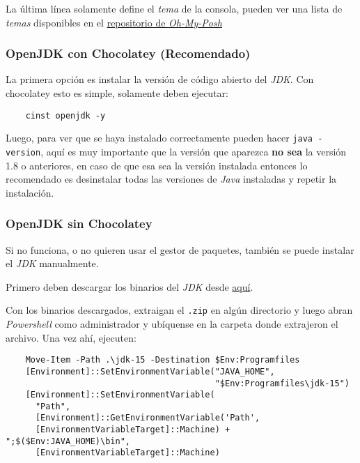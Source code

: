   La última línea solamente define el \textit{tema} de la consola, pueden ver una lista de
  \textit{temas} disponibles en el 
  \href{https://github.com/JanDeDobbeleer/oh-my-posh#themes}{repositorio de \textit{Oh-My-Posh}}

\subsubsection{OpenJDK con Chocolatey (Recomendado)}
  La primera opción es instalar la versión de código abierto del \textit{JDK}.
  Con chocolatey esto es simple, solamente deben ejecutar:
  \begin{verbatim}
    cinst openjdk -y
  \end{verbatim}
  
  Luego, para ver que se haya instalado correctamente pueden hacer \texttt{java -version}, aquí es
  muy importante que la versión que aparezca \textbf{no sea} la versión 1.8 o anteriores, en caso 
  de que esa sea la versión instalada entonces lo recomendado es desinstalar todas las versiones
  de \textit{Java} instaladas y repetir la instalación.

\subsubsection{OpenJDK sin Chocolatey}
  Si no funciona, o no quieren usar el gestor de paquetes, también se puede instalar el 
  \textit{JDK} manualmente.
  
  Primero deben descargar los binarios del \textit{JDK} desde 
  \href{
    https://download.java.net/java/GA/jdk15.0.2/0d1cfde4252546c6931946de8db48ee2/7/GPL/openjdk-15.0.2_windows-x64_bin.zip
    }{aquí}.
  
  Con los binarios descargados, extraigan el \texttt{.zip} en algún directorio y luego 
  abran \textit{Powershell} como administrador y ubíquense en la carpeta donde extrajeron el 
  archivo.
  Una vez ahí, ejecuten:

  \begin{verbatim}
    Move-Item -Path .\jdk-15 -Destination $Env:Programfiles
    [Environment]::SetEnvironmentVariable("JAVA_HOME", 
                                          "$Env:Programfiles\jdk-15")
    [Environment]::SetEnvironmentVariable(
      "Path", 
      [Environment]::GetEnvironmentVariable('Path', 
      [EnvironmentVariableTarget]::Machine) + ";$($Env:JAVA_HOME)\bin", 
      [EnvironmentVariableTarget]::Machine)
  \end{verbatim}


